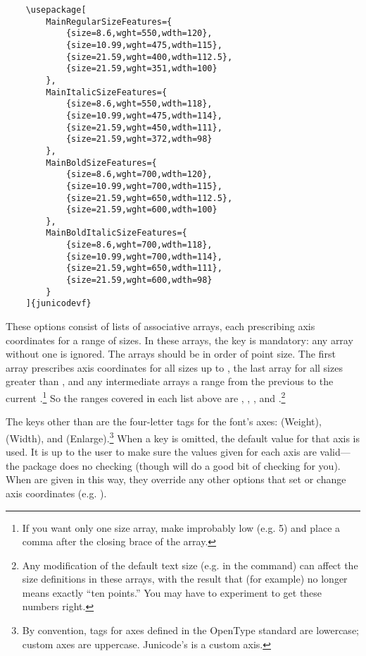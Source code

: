 \footnotesize
\begin{verbatim}
    \usepackage[
        MainRegularSizeFeatures={
            {size=8.6,wght=550,wdth=120},
            {size=10.99,wght=475,wdth=115},
            {size=21.59,wght=400,wdth=112.5},
            {size=21.59,wght=351,wdth=100}
        },
        MainItalicSizeFeatures={
            {size=8.6,wght=550,wdth=118},
            {size=10.99,wght=475,wdth=114},
            {size=21.59,wght=450,wdth=111},
            {size=21.59,wght=372,wdth=98}
        },
        MainBoldSizeFeatures={
            {size=8.6,wght=700,wdth=120},
            {size=10.99,wght=700,wdth=115},
            {size=21.59,wght=650,wdth=112.5},
            {size=21.59,wght=600,wdth=100}
        },
        MainBoldItalicSizeFeatures={
            {size=8.6,wght=700,wdth=118},
            {size=10.99,wght=700,wdth=114},
            {size=21.59,wght=650,wdth=111},
            {size=21.59,wght=600,wdth=98}
        }
    ]{junicodevf}
\end{verbatim}
\normalsize

\noindent These options consist of lists of associative arrays, each
prescribing axis coordinates for a range of sizes. In these arrays,
the  key is mandatory: any array without one is ignored. The
arrays should be in order of point size. The first array
prescribes axis coordinates for all sizes up to , the last array for all sizes
greater than , and any intermediate arrays a range from the previous to the
current .\footnote{%
If you want only one size array, make  improbably low (e.g. 5) and place
a comma after the closing brace of the array.%
} So the ranges covered in each list above are , ,
,
and .\footnote{Any modification of the default text size (e.g. in the
 command) can affect the size definitions in these
arrays, with the result that (for example)
 no longer means exactly “ten points.” You may have to experiment to get these numbers
right.}

The keys other than  are the four-letter tags for the font's axes: 
(Weight),  (Width), and  (Enlarge).\footnote{%
By convention, tags for axes defined in the OpenType standard are lowercase; custom axes
are uppercase. Junicode’s  is a custom axis.%
} When a key
is omitted, the default value for that axis is used. It is up to the user to make sure the values
given for each axis are valid---the package does no checking (though {\fspec} will do a good bit
of checking for you). When  are given in
this way, they override any other options that set or change axis coordinates
(e.g. ).

